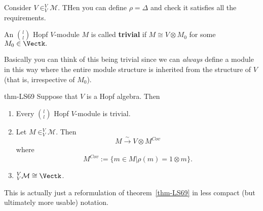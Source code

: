 \documentclass[12pt]{article}
\begin{document}
\begin{ex}
	Consider $V\in _V^V\mathcal{M}$. THen you can define $\rho=\Delta$ and check it satisfies all the requirements.
\end{ex}
\begin{defn}
	An $\binom{l}{l}$ Hopf $V$-module $M$ is called \textbf{trivial} if $M\cong V\otimes M_0$ for some $M_0\in\Vectk.$
\end{defn}
\begin{rmk}
	Basically you can think of this being trivial since we can \textit{always} define a module in this way
	where the entire module structure is inherited from the structure of $V$ (that is, irrespective of $M_0$).
\end{rmk}
\begin{thm-prime}{thm-LS69}%
	Suppose that $V$ is a Hopf algebra. Then
	\begin{enumerate}
		\item Every $\binom{l}{l}$ Hopf $V$-module is trivial.
		\item Let $M\in _V^V\mathcal{M}$. Then 
		\[M\xrightarrow{\sim} V\otimes M^{Cov}\]
		where
		\[M^{Cov}:=\{m\in M|\rho(m)=1\otimes m\}.\]
		\item $_V^V\mathcal{M}\cong \Vectk$.
	\end{enumerate}
\end{thm-prime}
\begin{rmk}
	This is actually just a reformulation of theorem~\ref{thm-LS69} in less compact (but ultimately more usable) notation.
\end{rmk}
\end{document}
